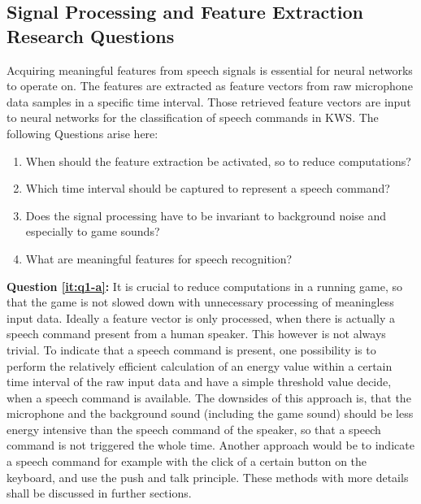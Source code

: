 \subsection{Signal Processing and Feature Extraction Research Questions}\label{sec:intro_rq_signal}
Acquiring meaningful features from speech signals is essential for neural networks to operate on. 
The features are extracted as feature vectors from raw microphone data samples in a specific time interval. 
Those retrieved feature vectors are input to neural networks for the classification of speech commands in KWS. 
The following Questions arise here:
\begin{enumerate}[label={Q.1.\alph*)}, leftmargin=1.75cm]
  \item When should the feature extraction be activated, so to reduce computations?\label{it:q1-a}
  \item Which time interval should be captured to represent a speech command?\label{it:q1-b}
  \item Does the signal processing have to be invariant to background noise and especially to game sounds?\label{it:q1-c}
  \item What are meaningful features for speech recognition?\label{it:q1-d}
\end{enumerate}
\noindent
\textbf{Question \ref{it:q1-a}:} 
It is crucial to reduce computations in a running game, so that the game is not slowed down with unnecessary processing of meaningless input data.
Ideally a feature vector is only processed, when there is actually a speech command present from a human speaker. 
This however is not always trivial.
To indicate that a speech command is present, one possibility is to perform the relatively efficient calculation of an energy value within a certain time interval of the raw input data and have a simple threshold value decide, when a speech command is available. 
The downsides of this approach is, that the microphone and the background sound (including the game sound) should be less energy intensive than the speech command of the speaker, so that a speech command is not triggered the whole time.
Another approach would be to indicate a speech command for example with the click of a certain button on the keyboard, and use the push and talk principle. 
These methods with more details shall be discussed in further sections.

